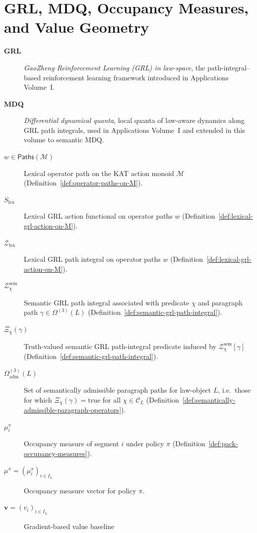 \documentclass[11pt]{book}
\theoremstyle{plain}
\theoremstyle{definition}
\theoremstyle{remark}
\begin{document}
\section*{GRL, MDQ, Occupancy Measures, and Value Geometry}

\begin{description}
  \item[\textbf{GRL}] \emph{GaoZheng Reinforcement Learning (GRL) in
        law-space}, the path-integral–based reinforcement learning
        framework introduced in Applications Volume~I.
  \item[\textbf{MDQ}] \emph{Differential dynamical quanta}, local
        quanta of law-aware dynamics along GRL path integrals, used in
        Applications Volume~I and extended in this volume to semantic
        MDQ.
  \item[$w\in\mathsf{Paths}(\mathcal{M})$] Lexical operator path on the
        KAT action monoid $\mathcal{M}$
        (Definition~\ref{def:operator-paths-on-M}).
  \item[$S_{\mathrm{lex}}$] Lexical GRL action functional on operator
        paths $w$ (Definition~\ref{def:lexical-grl-action-on-M}).
  \item[$\mathcal{Z}_{\mathrm{lex}}$] Lexical GRL path integral on
        operator paths $w$ (Definition~\ref{def:lexical-grl-action-on-M}).
  \item[$\mathcal{Z}^{\mathrm{sem}}_\chi$] Semantic GRL path integral
        associated with predicate $\chi$ and paragraph path
        $\gamma\in\Omega^{(3)}(L)$
        (Definition~\ref{def:semantic-grl-path-integral}).
  \item[$\Xi_\chi(\gamma)$] Truth-valued semantic GRL path-integral
        predicate induced by $\mathcal{Z}^{\mathrm{sem}}_\chi[\gamma]$
        (Definition~\ref{def:semantic-grl-path-integral}).
  \item[$\Omega^{(3)}_{\mathrm{adm}}(L)$] Set of semantically
        admissible paragraph paths for law-object $L$, i.e.\ those for
        which $\Xi_\chi(\gamma)=\mathrm{true}$ for all
        $\chi\in\mathcal{C}_L$
        (Definition~\ref{def:semantically-admissible-paragraph-operators}).
  \item[$\mu_i^\pi$] Occupancy measure of segment $i$ under policy
        $\pi$ (Definition~\ref{def:pack-occupancy-measures}).
  \item[$\mu^\pi=(\mu_i^\pi)_{i\in I_L}$] Occupancy measure vector for
        policy $\pi$.
  \item[$\mathbf{v}=(v_i)_{i\in I_L}$] Gradient-based value baseline

\end{description}
\end{document}
